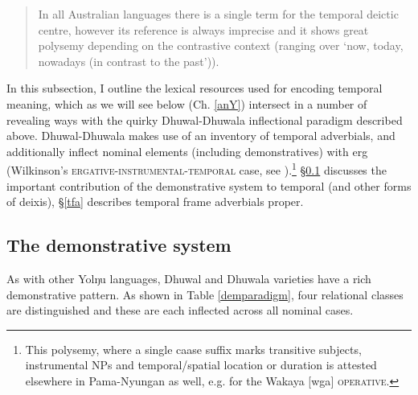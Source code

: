 \begin{quote}
	In all Australian languages there is a single term for the temporal deictic centre, however its reference is always imprecise and it shows great polysemy depending on the contrastive context (ranging over ‘now, today, nowadays (in contrast to the past’)).\\\hspace*{\fill}\citeyearpar[147]{Austin1998}
\end{quote}


In this subsection, I outline the lexical resources used for encoding temporal meaning, which as we will see below (Ch. \ref{anY}) intersect in a number of revealing ways with the quirky Dhuwal-Dhuwala inflectional paradigm described above. Dhuwal-Dhuwala makes use of an inventory of temporal adverbials, and additionally inflect nominal elements (including demonstratives) with \gls{erg} (Wilkinson's \textsc{ergative-instrumental-temporal} case, see \citeyear[131,157\textit{ff}]{Wilkinson1991}).\footnote{This polysemy, where a single caase suffix marks transitive subjects, instrumental NPs and temporal/spatial location or duration is attested elsewhere in Pama-Nyungan as well, e.g. \citet[§2.3.3]{Breen1974} for the Wakaya [\gls{wga}] \textsc{operative}.} §\ref{dempara} discusses the important contribution of the demonstrative system to temporal (and other forms of deixis), §\ref{tfa} describes temporal frame adverbials proper.


\subsection{The demonstrative system}\label{dempara}

As with other Yolŋu languages, Dhuwal and Dhuwala varieties have a rich demonstrative pattern. As shown in Table \ref{demparadigm}, four relational classes are distinguished and these are each inflected across all nominal cases. 



